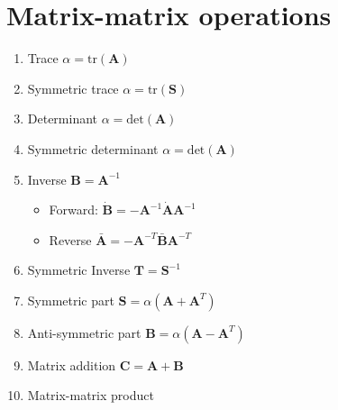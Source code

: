 \documentclass{article}
\begin{document}
\section{Matrix-matrix operations}

\begin{enumerate}
\item Trace $\alpha = \text{tr}(\mathbf{A})$
\item Symmetric trace $\alpha = \text{tr}(\mathbf{S})$ 
\item Determinant $\alpha = \text{det}(\mathbf{A})$
\item Symmetric determinant $\alpha = \text{det}(\mathbf{A})$
\item Inverse $\mathbf{B} = \mathbf{A}^{-1}$
\begin{itemize}
\item Forward: $\dot{\mathbf{B}} = - \mathbf{A}^{-1} \dot{\mathbf{A}} \mathbf{A}^{-1}$ 
\item Reverse $\bar{\mathbf{A}} = - \mathbf{A}^{-T} \bar{\mathbf{B}} \mathbf{A}^{-T}$
\end{itemize}
\item Symmetric Inverse $\mathbf{T} = \mathbf{S}^{-1}$
\item Symmetric part $\mathbf{S} = \alpha(\mathbf{A} + \mathbf{A}^{T})$
\item Anti-symmetric part $\mathbf{B} = \alpha (\mathbf{A} - \mathbf{A}^{T})$
\item Matrix addition $\mathbf{C} = \mathbf{A} + \mathbf{B}$
\item Matrix-matrix product
\end{enumerate}
\end{document}
